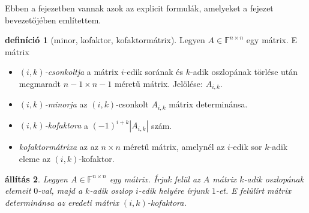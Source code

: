 \documentclass[9pt, a4paper, showtrims]{memoir}
\theoremstyle{plain}
\newtheorem{proposition}{állítás}[chapter]
\theoremstyle{remark}
\theoremstyle{definition}
\newtheorem{definition}[proposition]{definíció}
\begin{document}
Ebben a fejezetben vannak azok az explicit formulák,
amelyeket a fejezet bevezetőjében említettem.
\begin{definition}[minor, kofaktor, kofaktormátrix]
    Legyen $A\in\mathbb{F}^{n\times n}$ egy mátrix.
    E mátrix
    \begin{itemize}
        \item\emph{$\left( i,k \right)$-csonkoltja}
    a mátrix $i$-edik sorának és $k$-adik oszlopának törlése után megmaradt 
    $n-1\times n-1$ méretű mátrix. Jelölése: $A_{i,k}$.
        \item\emph{$\left( i,k \right)$-minorja}
            az $(i,k)$-csonkolt $A_{i,k}$ mátrix determinánsa.
        \item\emph{$\left( i,k \right)$-kofaktora}
            a $\left( -1 \right)^{i+k}|A_{i,k}|$ szám.
        \item\emph{kofaktormátrixa}
            az az $n\times n$ méretű mátrix, 
            amelynél az $i$-edik sor $k$-adik eleme az $\left( i,k \right)$-kofaktor.\qedhere
    \end{itemize}
\end{definition}
\begin{proposition}
    Legyen $A\in\mathbb{F}^{n\times n}$ egy mátrix.
    Írjuk felül az $A$ mátrix $k$-adik oszlopának elemeit $0$-val,
    majd a $k$-adik oszlop $i$-edik helyére írjunk $1$-et.
    E felülírt mátrix determinánsa az eredeti mátrix $\left( i,k \right)$-kofaktora.
\end{proposition}
\end{document}
